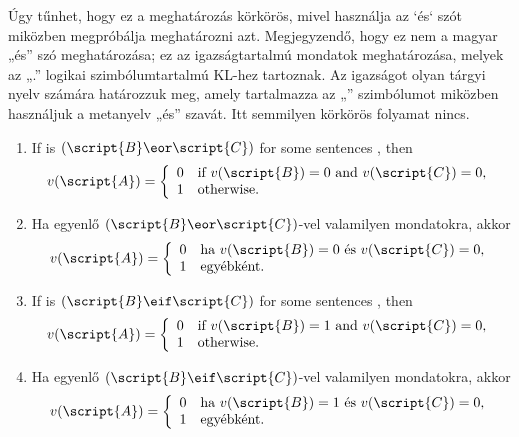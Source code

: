 Úgy tűnhet, hogy ez a meghatározás körkörös, mivel használja az `és` szót miközben megpróbálja meghatározni azt. Megjegyzendő, hogy ez nem a magyar „és” szó meghatározása; ez az igazságtartalmú mondatok meghatározása, melyek az „\eand.” logikai szimbólumtartalmú KL-hez tartoznak. Az igazságot olyan tárgyi nyelv számára határozzuk meg, amely tartalmazza az „\eand” szimbólumot miközben használjuk a metanyelv „és” szavát. Itt semmilyen körkörös folyamat nincs.

\begin{enumerate}
\item If  is $(\script{B}\eor\script{C})$ for some sentences , then
\begin{displaymath}v(\script{A}) =
	\left\{\begin{array}{ll}
	0 & \mbox{if $v(\script{B}) = 0$ and $v(\script{C}) = 0$,}\\
	1 & \mbox{otherwise.}
	\end{array}\right.
\end{displaymath}
\item Ha  egyenlő $(\script{B}\eor\script{C})$-vel valamilyen   mondatokra, akkor
\begin{displaymath}v(\script{A}) =
	\left\{\begin{array}{ll}
	0 & \mbox{ha $v(\script{B}) = 0$ és $v(\script{C}) = 0$,}\\
	1 & \mbox{egyébként.}
	\end{array}\right.
\end{displaymath}


\item If  is $(\script{B}\eif\script{C})$ for some sentences , then
\begin{displaymath}v(\script{A}) =
	\left\{\begin{array}{ll}
	0 & \mbox{if $v(\script{B}) = 1$ and $v(\script{C}) = 0$,}\\
	1 & \mbox{otherwise.}
	\end{array}\right.
\end{displaymath}
\item Ha  egyenlő $(\script{B}\eif\script{C})$-vel valamilyen   mondatokra, akkor
\begin{displaymath}v(\script{A}) =
	\left\{\begin{array}{ll}
	0 & \mbox{ha $v(\script{B}) = 1$ és $v(\script{C}) = 0$,}\\
	1 & \mbox{egyébként.}
	\end{array}\right.
\end{displaymath}


\end{enumerate}
